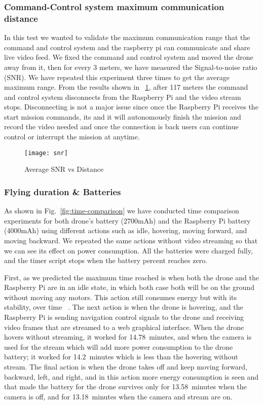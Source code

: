 \documentclass[../main.tex]{subfiles}
\begin{document}
\subsubsection{Command-Control system maximum communication distance}

In this test we wanted to validate the maximum communication range that
the command and control system and the raspberry pi can communicate
and share live video feed. We fixed the command and control system and moved
the drone away from it, then for every 3 meters, we have 
measured the Signal-to-noise ratio (SNR).
We have repeated this experiment three times to get the average maximum range.
From the results shown in ~\ref{fig:snr-vs-distance}, after 117 meters 
the command and control system disconnects from the Raspberry Pi
and the video stream stops. Disconnecting is not a major issue
since once the Raspberry Pi receives the start mission commands, its 
and it will autonomously finish the mission and record the video needed
and once the connection is back users can continue control or interrupt the mission
at anytime.
 
\begin{figure}[!t]
	\centering
	\texttt{[image: snr]}
	\caption{Average SNR vs Distance}
	\label{fig:snr-vs-distance}
\end{figure}

\subsubsection{Flying duration \& Batteries}

As shown in Fig.~\ref{fig:time-comparison} we have 
conducted time comparison experiments for both drone's
battery (2700mAh) and the Raspberry Pi battery (4000mAh) 
using different actions such as idle, hovering, 
moving forward, and moving backward. We repeated 
the same actions without video streaming so that 
we can see its effect on power consumption. 
All the batteries were charged fully, and the timer 
script stops when the battery percent reaches zero. 

First, as we predicted 
the maximum time reached is when both the drone and 
the Raspberry Pi are in an idle state, in which both case both will 
be on the ground without moving any motors.
This action still consumes energy but with 
its stability, over time ~\cite{Abey18}. 
The next action is when the drone is hovering, and 
the Raspberry Pi is sending navigation control 
signals to the drone and receiving video frames 
that are streamed to a web graphical interface. 
When the drone hovers without streaming, it worked 
for \SI{14.78}{minutes}, and when the camera is used for 
the stream which will add more power consumption to 
the drone battery; it worked for \SI{14.2}{minutes} which 
is less than the hovering without stream. The final 
action is when the drone takes off and keep moving 
forward, backward, left, and right, and in this action 
more energy consumption is seen and that made the 
battery for the drone survives only for \SI{13.58}{minutes}
when the camera is off, and for \SI{13.18}{minutes} 
when the camera and stream are on.
\end{document}
